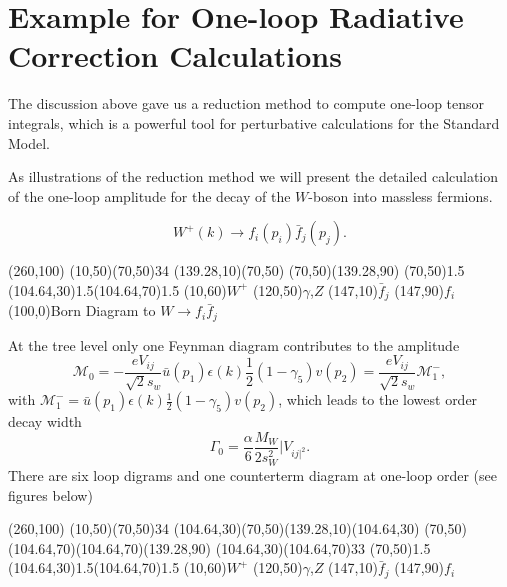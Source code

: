\section{Example for One-loop Radiative Correction Calculations }
The discussion above gave us a reduction method to compute one-loop tensor integrals, which is a powerful tool for perturbative calculations for the Standard Model. 

As illustrations of the reduction method we will present the detailed calculation of the one-loop amplitude for the decay of the $W$-boson into massless fermions.

\begin{equation}
W^+(k)\to f_i(p_i)\bar{f}_j(p_j).
\end{equation}

\begin{center}
	\begin{axopicture}(260,100)
		\Photon(10,50)(70,50){3}{4}
		\Line[arrow](139.28,10)(70,50)
		\Line[arrow](70,50)(139.28,90)
		\Vertex(70,50){1.5}
		\Vertex(104.64,30){1.5}\Vertex(104.64,70){1.5}	
		\Text(10,60){$W^+$}
		\Text(120,50){$\gamma$,$Z$}
		\Text(147,10){$\bar{f}_j$}
		\Text(147,90){$f_i$}
		\Text(100,0){Born Diagram to $W\to f_i\bar{f}_j$}
	\end{axopicture}
\end{center}

At the tree level only one Feynman diagram contributes to the amplitude
\begin{equation}
\mathcal{M}_0=-\frac{eV_{ij}}{\sqrt{2}s_w}\bar{u}(p_1)\epsilon(k)\frac{1}{2}(1-\gamma_5)v(p_2)=\frac{eV_{ij}}{\sqrt{2}s_w}\mathcal{M}^-_1,
\end{equation}
with $\mathcal{M}_1^-=\bar{u}(p_1)\epsilon(k)\frac{1}{2}(1-\gamma_5)v(p_2)$, which leads to the lowest order decay width
\begin{equation}
\Gamma_0=\frac{\alpha}{6}\frac{M_W}{2s_W^2}|V_{ij|^2}.
\end{equation}
There are six loop digrams and one counterterm diagram at one-loop order (see figures below)

\begin{center}
	\begin{axopicture}(260,100)
		\Photon(10,50)(70,50){3}{4}
		\Line[arrow](104.64,30)(70,50)\Line[arrow](139.28,10)(104.64,30)
		\Line[arrow](70,50)(104.64,70)\Line[arrow](104.64,70)(139.28,90)
		\Photon(104.64,30)(104.64,70){3}{3}
		\Vertex(70,50){1.5}
		\Vertex(104.64,30){1.5}\Vertex(104.64,70){1.5}	
		\Text(10,60){$W^+$}
		\Text(120,50){$\gamma$,$Z$}
		\Text(147,10){$\bar{f}_j$}
		\Text(147,90){$f_i$}
	\end{axopicture}
\end{center}


